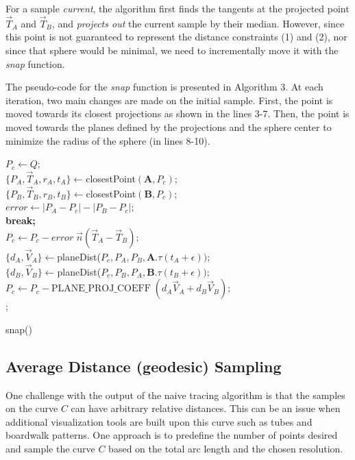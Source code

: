\documentclass[journal, letterpaper]{IEEEtran}
\begin{document}
For a sample \textit{current}, the algorithm first finds the tangents
at the projected point $\vec{T}_A$ and $\vec{T}_B$, and \textit{projects out} the current sample by their median.
However, since this point is not guaranteed to represent the distance constraints (1) and (2), nor since that
sphere would be minimal, we need to incrementally move it with the \textit{snap} function. 

The pseudo-code for the \textit{snap} function is presented in Algorithm 3. At each iteration,
two main changes are made on the initial sample. First, the point is moved towards its closest projections
as shown in the lines 3-7. Then, the point is moved towards the planes defined by the projections 
and the sphere center to minimize the radius of the sphere (in lines 8-10).

\begin{algorithm}[ht!]
  $P_c \leftarrow Q$; \\
   {
    $\{P_A, \vec{T}_A, r_A, t_A\} \leftarrow $closestPoint$(\mathbf{A}, P_c)$;  \\
    $\{P_B, \vec{T}_B, r_B, t_B\} \leftarrow $closestPoint$(\mathbf{B}, P_c)$;  \\
    $error \leftarrow |P_A - P_c| - |P_B - P_c|;$\\ 
     \textbf{break;} \\
    $P_c \leftarrow P_c - error \;\vec{n}(\vec{T}_A - \vec{T}_B);$ \\
    $\{d_A, \vec{V}_A\} \leftarrow $planeDist($P_c, P_A, P_B, \mathbf{A}.\tau(t_A + \epsilon))$;\\
    $\{d_B, \vec{V}_B\} \leftarrow $planeDist($P_c, P_B, P_A, \mathbf{B}.\tau(t_B + \epsilon))$;\\
    $P_c \leftarrow P_c - \text{PLANE\_PROJ\_COEFF} \;(d_A \vec{V}_A + d_B \vec{V}_B); $\\
  }
  ;
  \caption{snap()}
\end{algorithm}


\subsection{Average Distance (geodesic) Sampling}

One challenge with the output of the naive tracing algorithm is that the samples on the curve $C$
can have arbitrary relative distances. This can be an issue when additional visualization tools
are built upon this curve such as tubes and boardwalk patterns. One approach is to predefine
the number of points desired and sample the curve $C$ based on the total arc length and the 
chosen resolution. 
\end{document}
